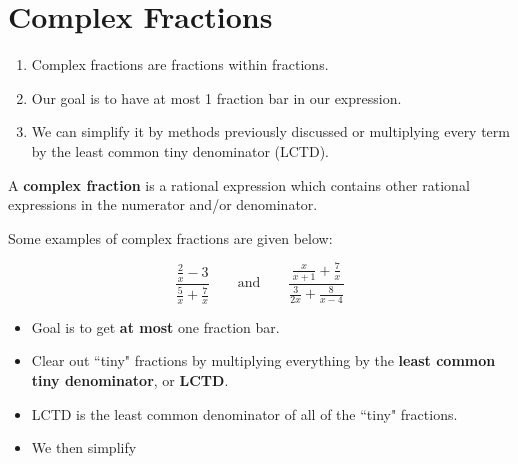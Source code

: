 \documentclass{article}
\newcounter{example}[section]
\begin{document}
\section*{Complex Fractions}

\begin{tcolorbox}[colframe=orange!70!white, coltitle=black, colback = white, title=\textbf{Summary}]
\begin{enumerate}
    \item Complex fractions are fractions within fractions.
    \item Our goal is to have at most 1 fraction bar in our expression.
    \item We can simplify it by methods previously discussed or multiplying every term by the least common tiny denominator (LCTD).
\end{enumerate}
\end{tcolorbox}
\smallskip 

\begin{tcolorbox}[colframe=green!60!black, colback = white,title=\textbf{Complex Fraction}]
A \textbf{complex fraction} is a rational expression which contains other rational expressions in the numerator and/or denominator.
\end{tcolorbox}
\smallskip 


Some examples of complex fractions are given below:

\[
\frac{\frac{2}{x} - 3}{\frac{5}{x} + \frac{7}{x}}
\qquad \text{and} \qquad
\frac{\frac{x}{x+1} + \frac{7}{x}}{\frac{3}{2x} + \frac{8}{x-4}}
\]
\bigskip 

\begin{itemize}
\item Goal is to get {\color{blue}\textbf{at most}} one fraction bar.
\item Clear out ``tiny" fractions by multiplying everything by the {\color{blue}\textbf{least common tiny denominator}}, or {\color{blue}\textbf{LCTD}}.
\item LCTD is the least common denominator of all of the ``tiny" fractions.
\item We then simplify \Cooley
\end{itemize}
\vspace{0.25in}


\end{document}
